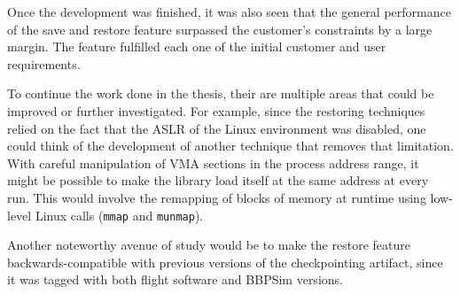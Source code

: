 Once the development was finished, it was also seen that the general performance of the save and restore feature surpassed the customer's constraints by a large margin. The feature fulfilled each one of the initial customer and user requirements.

To continue the work done in the thesis, their are multiple areas that could be improved or further investigated. For example, since the restoring techniques relied on the fact that the \gls{ASLR} of the Linux environment was disabled, one could think of the development of another technique that removes that limitation. With careful manipulation of \gls{VMA} sections in the process address range, it might be possible to make the  library load itself at the same address at every run. This would involve the  remapping of blocks of memory at runtime using low-level Linux calls (\texttt{mmap} and \texttt{munmap}). 

Another noteworthy avenue of study would be to make the restore feature backwards-compatible with previous versions of the checkpointing artifact, since it was tagged with both flight software and BBPSim versions.